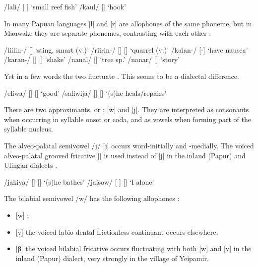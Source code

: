 \ea
\label{ex:2:lateral}
\ea
/lali/  [ ]  `small reef fish'
\ex
/kaul/  []  `hook'
\z
\z

In many Papuan languages [l] and [r] are allophones of the same phoneme, but in Mauwake they are separate phonemes, contrasting with each other :
\newpage

\ea
\label{ex:2:lrcontrast}
\ea
/liilin-/  []  `sting, smart (v.)'
\ex
/riirin-/  [] {\Tilde} []  `quarrel (v.)'
\ex
/kalan-/  [-]  `have nausea' 
\ex
/karan-/  [] {\Tilde} []  `shake'
\ex
/nanal/  []  `tree sp.'
\ex
/nanar/  []  `story'
\z
\z

Yet in a few words the two fluctuate . This seems to be a dialectal difference.

\ea
\label{ex:2:lrfluct}
\ea
/eliwa/  [] {\Tilde} []  `good'
\ex
/saliwija/  [] {\Tilde} []  `(s)he heals/repairs'
\z
\z 

There are two approximants, or : [w] and [j].  They are interpreted as consonants when occurring in syllable onset or coda, and as vowels when forming part of the syllable nucleus. 

The alveo-palatal semivowel /j/ [j] occurs word-initially and -medially. The voiced alveo-palatal grooved fricative [{\textyogh}] is used instead of [j] in the inland (Papur) and Ulingan dialects .

\ea
\label{ex:2:semiVj}
\ea
/jakiya/  [] {\Tilde} []  `(s)he bathes'
\ex
/jaisow/  [ ] {\Tilde} []  `I alone' 
\z
\z

The bilabial semivowel /w/ has the following allophones :

\begin{itemize}
 \item{} [w]  ;
 \item{} [v]  the voiced labio-dental frictionless continuant occurs elsewhere;
 \item{} [β]  the voiced bilabial fricative occurs fluctuating with both [w] and [v] in the inland (Papur) dialect, very strongly in the village of Yeipamir.
\end{itemize}


